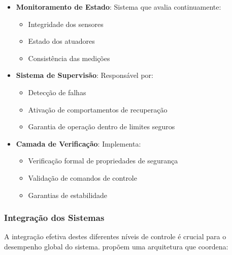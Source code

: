 \begin{itemize}
    \item \textbf{Monitoramento de Estado}: Sistema que avalia continuamente:
          \begin{itemize}
              \item Integridade dos sensores
              \item Estado dos atuadores
              \item Consistência das medições
          \end{itemize}

    \item \textbf{Sistema de Supervisão}: Responsável por:
          \begin{itemize}
              \item Detecção de falhas
              \item Ativação de comportamentos de recuperação
              \item Garantia de operação dentro de limites seguros
          \end{itemize}

    \item \textbf{Camada de Verificação}: Implementa:
          \begin{itemize}
              \item Verificação formal de propriedades de segurança
              \item Validação de comandos de controle
              \item Garantias de estabilidade
          \end{itemize}
\end{itemize}

\subsubsection{Integração dos Sistemas}

A integração efetiva destes diferentes níveis de controle é crucial para o
desempenho global do sistema. \cite{OKelly2020F1TENTH} propõem uma arquitetura
que coordena:

